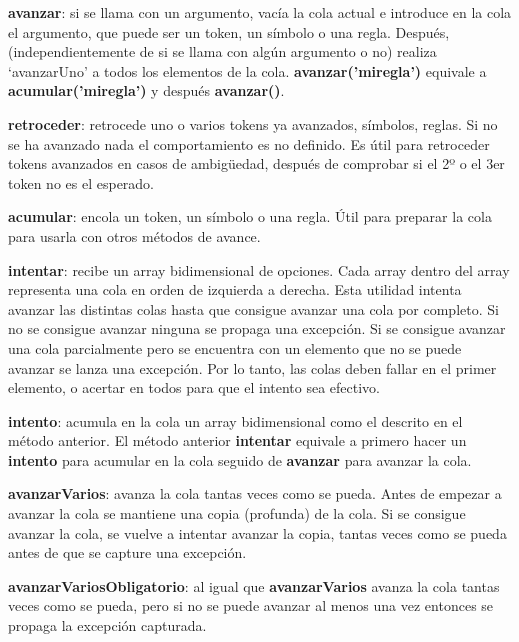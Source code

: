 \documentclass{report}
\begin{document}
	\vspace{10px}
	\noindent
	\textbf{avanzar}: si se llama con un argumento, vacía la cola actual e introduce en la cola el argumento, que puede ser un token, un símbolo o una regla. Después, (independientemente de si se llama con algún argumento o no) realiza `avanzarUno' a todos los elementos de la cola.  \textbf{avanzar('miregla')} equivale a \textbf{acumular('miregla')} y después \textbf{avanzar()}.
	
	\vspace{10px}
	\noindent
	\textbf{retroceder}: retrocede uno o varios tokens ya avanzados, símbolos, reglas. Si no se ha avanzado nada el comportamiento es no definido. Es útil para retroceder tokens avanzados en casos de ambigüedad, después de comprobar si el 2º o el 3er token no es el esperado. 
	
	\vspace{10px}
	\noindent
	\textbf{acumular}: encola un token, un símbolo o una regla. Útil para preparar la cola para usarla con otros métodos de avance.
	
	\vspace{10px}
	\noindent
	\textbf{intentar}: recibe un array bidimensional de opciones. Cada array dentro del array representa una cola en orden de izquierda a derecha. Esta utilidad intenta avanzar las distintas colas hasta que consigue avanzar una cola por completo. Si no se consigue avanzar ninguna se propaga una excepción. Si se consigue avanzar una cola parcialmente pero se encuentra con un elemento que no se puede avanzar se lanza una excepción. Por lo tanto, las colas deben fallar en el primer elemento, o acertar en todos para que el intento sea efectivo.
	
	\vspace{10px}
	\noindent
	\textbf{intento}: acumula en la cola un array bidimensional como el descrito en el método anterior. El método anterior \textbf{intentar} equivale a primero hacer un \textbf{intento} para acumular en la cola seguido de \textbf{avanzar} para avanzar la cola.
	
	\vspace{10px}
	\noindent
	\textbf{avanzarVarios}: avanza la cola tantas veces como se pueda. Antes de empezar a avanzar la cola se mantiene una copia (profunda) de la cola. Si se consigue avanzar la cola, se vuelve a intentar avanzar la copia, tantas veces como se pueda antes de que se capture una excepción.   
	
	\vspace{10px}
	\noindent
	\textbf{avanzarVariosObligatorio}: al igual que \textbf{avanzarVarios} avanza la cola tantas veces como se pueda, pero si no se puede avanzar al menos una vez entonces se propaga la excepción capturada.
	
\end{document}
